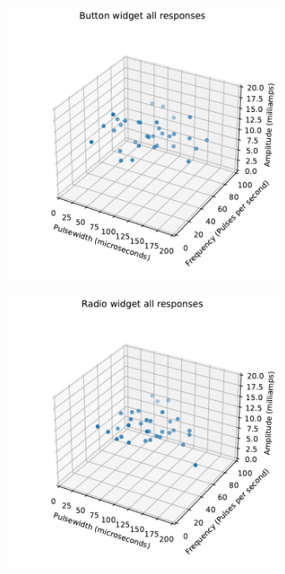\documentclass{mpaper}
\begin{document}
\begin{figure}
    \centering
    \begin{subfigure}{0.22\textwidth}
        \includegraphics[width=\textwidth]{images/20240321-134009.pdf}
    \end{subfigure} \hfill
    \begin{subfigure}{0.22\textwidth}
        \includegraphics[width=\textwidth]{images/20240321-134107.pdf}

\end{subfigure}
\end{figure}
\end{document}
